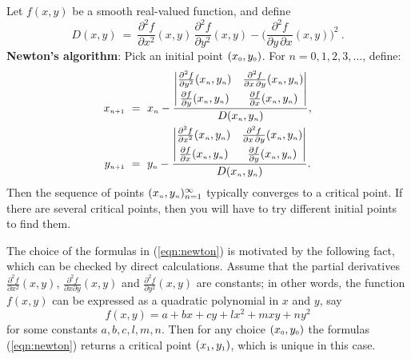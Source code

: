 Let $f(x,y)$ be a smooth real-valued function, and define
\begin{displaymath}
 D(x,y) ~=~ \dfrac{\partial^2 f}{\partial x^2}(x,y) \, \dfrac{\partial^2 f}{\partial y^2}(x,y) -
 \biggl( \dfrac{\partial^2 f}{\partial y \, \partial x}(x,y) \biggr)^2 ~.
\end{displaymath}
\textbf{Newton's algorithm}: Pick an initial point $(x_{\scriptscriptstyle 0},y_{\scriptscriptstyle 0})$. For $n = 0, 1, 2, 3, \dots$,
define:
\begin{equation}\label{eqn:newton}
\begin{aligned}
 \ssub{x}{n+1} ~&=~ \ssub{x}{n} -
  \frac{
    \begin{vmatrix}
     \frac{\partial^2 f}{\partial y^2}(\ssub{x}{n},\ssub{y}{n}) &
     \frac{\partial^2 f}{\partial x \, \partial y}(\ssub{x}{n},\ssub{y}{n})\smallskip\\
     \frac{\partial f}{\partial y}(\ssub{x}{n},\ssub{y}{n}) &
     \frac{\partial f}{\partial x}(\ssub{x}{n},\ssub{y}{n})
    \end{vmatrix}}{D(\ssub{x}{n},\ssub{y}{n})} ,
    \\
 \ssub{y}{n+1} ~&=~ \ssub{y}{n} -
  \frac{
    \begin{vmatrix}
     \frac{\partial^2 f}{\partial x^2}(\ssub{x}{n},\ssub{y}{n}) &
     \frac{\partial^2 f}{\partial x \, \partial y}(\ssub{x}{n},\ssub{y}{n})\smallskip\\
     \frac{\partial f}{\partial x}(\ssub{x}{n},\ssub{y}{n}) &
     \frac{\partial f}{\partial y}(\ssub{x}{n},\ssub{y}{n})
    \end{vmatrix}}{D(\ssub{x}{n},\ssub{y}{n})}.
\end{aligned}
\end{equation}
Then the sequence of points $(x_{\scriptscriptstyle n},y_{\scriptscriptstyle n})_{n=1}^{\infty}$ typically converges to a critical point. 
If there are several critical points, then you will have to try different initial points to find them.

The choice of the formulas in (\ref{eqn:newton}) is motivated by the following fact, which can be checked by direct calculations.
Assume that the partial derivatives $\tfrac{\partial^2 f}{\partial x^2}(x,y)$, $\tfrac{\partial^2 f}{\partial x\partial y}(x,y)$ and $\tfrac{\partial^2 f}{\partial y^2}(x,y)$ are constants;
in other words, the function $f(x,y)$ can be expressed as a quadratic polynomial in $x$ and $y$, say 
\[f(x,y)=a+bx+cy+lx^2+mxy+ny^2\]
for some constants $a,b,c,l,m,n$.
Then for any choice $(x_{\scriptscriptstyle 0},y_{\scriptscriptstyle 0})$ the formulas (\ref{eqn:newton}) returns a critical point $(x_{\scriptscriptstyle 1},y_{\scriptscriptstyle 1})$, which is unique in this case.

